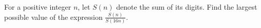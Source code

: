 For a positive integer $ n$,  let $ S(n)$ denote the sum of its digits. Find the largest possible value of the expression $ \frac {S(n)}{S(16n)}$.
